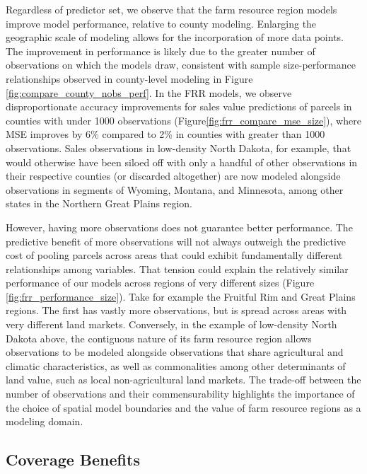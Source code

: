 \documentclass[12pt]{article}
\begin{document}
Regardless of predictor set, we observe that the farm resource region models improve model performance, relative to county modeling. Enlarging the geographic scale of modeling allows for the incorporation of more data points. The improvement in performance is likely due to the greater number of observations on which the models draw, consistent with sample size-performance relationships observed in county-level modeling in Figure \ref{fig:compare_county_nobs_perf}. In the FRR models, we observe disproportionate accuracy improvements for sales value predictions of parcels in counties with under 1000 observations (Figure\ref{fig:frr_compare_mse_size}), where MSE improves by 6\% compared to 2\% in counties with greater than 1000 observations. Sales observations in low-density North Dakota, for example, that would otherwise have been siloed off with only a handful of other observations in their respective counties (or discarded altogether) are now modeled alongside observations in segments of Wyoming, Montana, and Minnesota, among other states in the Northern Great Plains region.

However, having more observations does not guarantee better performance. The predictive benefit of more observations will not always outweigh the predictive cost of pooling parcels across areas that could exhibit fundamentally different relationships among variables. That tension could explain the relatively similar performance of our models across regions of very different sizes (Figure \ref{fig:frr_performance_size}). Take for example the Fruitful Rim and Great Plains regions. The first has vastly more observations, but is spread across areas with very different land markets. Conversely, in the example of low-density North Dakota above, the contiguous nature of its farm resource region allows observations to be modeled alongside observations that share agricultural and climatic characteristics, as well as commonalities among other determinants of land value, such as local non-agricultural land markets. The trade-off between the number of observations and their commensurability highlights the importance of the choice of spatial model boundaries and the value of farm resource regions as a modeling domain. 

\subsection{Coverage Benefits}
\end{document}
